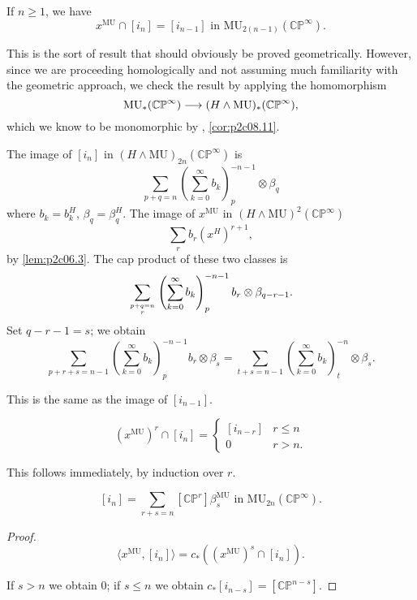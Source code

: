 \documentclass[../main]{subfiles}
\begin{document}
\begin{lemma}
\label{lem:ch210.3}
If $n \ge 1$, we have $$x^{\mathrm{MU}} \cap [i_n] = [i_{n - 1}] \text { in } \mathrm{MU}_{2(n - 1)} (\mathbb {CP}^\infty).$$
\end{lemma}

This is the sort of result that should obviously be proved geometrically. However, since we are proceeding homologically and not assuming much familiarity with the geometric approach, we check the result by applying the homomorphism $$\mathrm{MU}_\ast (\mathbb {CP}^\infty) \overset{}{\longrightarrow} (H \wedge \mathrm{MU})_\ast (\mathbb {CP}^\infty),$$ which we know to be monomorphic by , \ref{cor:p2c08.11}. 

The image of $[i_n]$ in $(H \wedge \mathrm{MU})_{2n} (\mathbb {CP}^\infty)$ is $$\sum_{p + q = n} \left(\sum_{k = 0}^\infty b_k\right)_p^{-n - 1} \otimes \beta_q$$ where $b_k = b_k^H$, $\beta_q = \beta_q^H$. The image of $x^{\mathrm{MU}}$ in $(H \wedge \mathrm{MU})^2(\mathbb {CP}^\infty)$ $$\sum_r b_r (x^H)^{r + 1},$$ by \eqref{lem:p2c06.3}. The cap product of these two classes is $$\sum_{{p + q = n} \atop r} \left(\sum_{k = 0}^\infty b_k\right)_p^{-n - 1} b_r \otimes \beta_{q - r - 1}.$$ Set $q - r - 1 = s$; we obtain $$\sum_{p + r + s = n - 1} \left(\sum_{k = 0}^\infty b_k\right)_p^{-n - 1} b_r \otimes \beta_s = \sum_{t + s = n - 1} \left(\sum_{k = 0}^\infty b_k\right)_t^{-n} \otimes \beta_s.$$

This is the same as the image of $[i_{n - 1}]$. 

\begin{corollary}
\label{cor:p2c10.4}
$$(x^{\mathrm{MU}})^r \cap [i_n] = \begin{cases}[i_{n - r}] & r \le n \\ 0 & r > n.\end{cases}$$
\end{corollary}

This follows immediately, by induction over $r$. 

\begin{corollary}
\label{cor:p2c10.5}
$$[i_n] = \sum_{r + s = n} [\mathbb {CP}^r] \beta_s^{\mathrm{MU}} \text { in } \mathrm {MU}_{2n} (\mathbb {CP}^\infty).$$
\end{corollary}
\begin{proof}
$$\langle x^{\mathrm{MU}}, [i_n]\rangle = c_\ast ((x^{\mathrm {MU}})^s \cap [i_n]).$$

If $s > n$ we obtain $0$; if $s \le n$ we obtain $c_\ast[i_{n - s}] = [\mathbb {CP}^{n - s}]$.
\end{proof}
\end{document}
